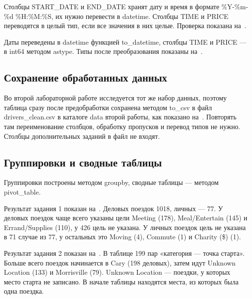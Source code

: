 \documentclass[a4paper,14pt]{extarticle}
\begin{document}
Столбцы START\_DATE и END\_DATE хранят дату и время в формате \%Y-\%m-\%d \%H:\%M:\%S, их нужно перевести в datetime. Столбцы TIME и PRICE переводятся в целый тип, если все значения в них целые. Проверка показана на~.


Даты переведены в datetime функцией to\_datetime, столбцы TIME и PRICE — в int64 методом astype. Типы после преобразования показаны на~.


\subsection{Сохранение обработанных данных}

Во второй лабораторной работе исследуется тот же набор данных, поэтому таблица сразу после предобработки сохранена методом to\_csv в файл drivers\_clean.csv в каталоге data второй работы, как показано на~. Повторять там переименование столбцов, обработку пропусков и перевод типов не нужно. Столбцы дополнительных заданий в файл не входят.


\subsection{Группировки и сводные таблицы}

Группировки построены методом groupby, сводные таблицы — методом pivot\_table.

Результат задания 1 показан на~. Деловых поездок 1018, личных — 77. У деловых поездок чаще всего указаны цели Meeting (178), Meal/Entertain (145) и Errand/Supplies (110), у 426 цель не указана. У личных поездок цель не указана в 71 случае из 77, у остальных это Moving (4), Commute (1) и Charity (\$) (1).


Результат задания 2 показан на~. В таблице 199 пар «категория — точка старта». Больше всего поездок начинается в Cary (198 деловых), затем идут Unknown Location (133) и Morrisville (79). Unknown Location — поездки, у которых место старта не записано. В начале таблицы находятся места, из которых была одна поездка.
\end{document}
